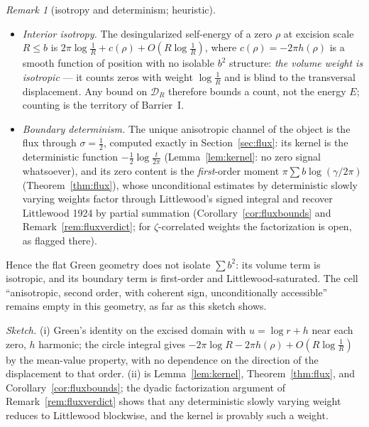 \documentclass[11pt]{amsart}
\theoremstyle{plain}
\theoremstyle{definition}
\theoremstyle{remark}
\newtheorem{remark}[theorem]{Remark}
\begin{document}
\begin{remark}[isotropy and determinism; heuristic]\label{prop:isotropy}
\begin{itemize}
\item[\textup{(i)}] \emph{Interior isotropy.} The desingularized self-energy of a zero $\rho$ at excision scale $R\le b$ is $2\pi\log\frac1R+c(\rho)+O(R\log\frac1R)$, where $c(\rho)=-2\pi h(\rho)$ is a smooth function of position with no isolable $b^2$ structure: \emph{the volume weight is isotropic} --- it counts zeros with weight $\log\frac1R$ and is blind to the transversal displacement. Any bound on $\mathcal D_R$ therefore bounds a count, not the energy $E$; counting is the territory of Barrier~I.
\item[\textup{(ii)}] \emph{Boundary determinism.} The unique anisotropic channel of the object is the flux through $\sigma=\tfrac12$, computed exactly in Section~\ref{sec:flux}: its kernel is the deterministic function $-\tfrac12\log\frac{t}{2\pi}$ \textup{(}Lemma~\ref{lem:kernel}: no zero signal whatsoever\textup{)}, and its zero content is the \emph{first}-order moment $\pi\sum b\log(\gamma/2\pi)$ \textup{(}Theorem~\ref{thm:flux}\textup{)}, whose unconditional estimates by deterministic slowly varying weights factor through Littlewood's signed integral and recover Littlewood 1924 by partial summation \textup{(}Corollary~\ref{cor:fluxbounds} and Remark~\ref{rem:fluxverdict}; for $\zeta$-correlated weights the factorization is open, as flagged there\textup{)}.
\end{itemize}
Hence the flat Green geometry does not isolate $\sum b^2$: its volume term is isotropic, and its boundary term is first-order and Littlewood-saturated. The cell ``anisotropic, second order, with coherent sign, unconditionally accessible'' remains empty in this geometry, as far as this sketch shows.

\emph{Sketch.}
(i) Green's identity on the excised domain with $u=\log r+h$ near each zero, $h$ harmonic; the circle integral gives $-2\pi\log R-2\pi h(\rho)+O(R\log\frac1R)$ by the mean-value property, with no dependence on the direction of the displacement to that order. (ii) is Lemma~\ref{lem:kernel}, Theorem~\ref{thm:flux}, and Corollary~\ref{cor:fluxbounds}; the dyadic factorization argument of Remark~\ref{rem:fluxverdict} shows that any deterministic slowly varying weight reduces to Littlewood blockwise, and the kernel is provably such a weight.
\end{remark}

\end{document}
